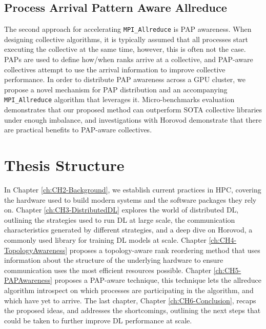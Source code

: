 \subsection{Process Arrival Pattern Aware Allreduce}
The second approach for accelerating \texttt{MPI\_Allreduce} is \gls{PAP} awareness.
When designing collective algorithms, it is typically assumed that all processes start executing the collective at the same time, however, this is often not the case.
\gls{PAP}s are used to define how/when ranks arrive at a collective, and \gls{PAP}-aware collectives attempt to use the arrival information to improve collective performance. 
In order to distribute \gls{PAP} awareness across a \gls{GPU} cluster, we propose a novel mechanism for \gls{PAP} distribution and an accompanying \texttt{MPI\_Allreduce} algorithm that leverages it.
Micro-benchmarks evaluation demonstrates that our proposed method can outperform \gls{SOTA} collective libraries under enough imbalance, and investigations with Horovod demonstrate that there are practical benefits to \gls{PAP}-aware collectives.

\section{Thesis Structure}
In Chapter \ref{ch:CH2-Background}, we establish current practices in \gls{HPC}, covering the hardware used to build modern systems and the software packages they rely on.
Chapter \ref{ch:CH3-DistributedDL} explores the world of distributed \gls{DL}, outlining the strategies used to run \gls{DL} at large scale, the communication characteristics generated by different strategies, and a deep dive on Horovod, a commonly used library for training \gls{DL} models at scale.
Chapter \ref{ch:CH4-TopologyAwareness} proposes a topology-aware rank reordering method that uses information about the structure of the underlying hardware to ensure communication uses the most efficient resources possible.
Chapter \ref{ch:CH5-PAPAwareness} proposes a \gls{PAP}-aware technique, this technique lets the allreduce algorithm introspect on which processes are participating in the algorithm, and which have yet to arrive.
The last chapter, Chapter \ref{ch:CH6-Conclusion}, recaps the proposed ideas, and addresses the shortcomings, outlining the next steps that could be taken to further improve \gls{DL} performance at scale.